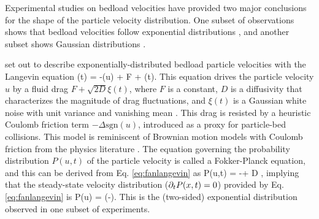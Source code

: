 Experimental studies on bedload velocities have provided two major conclusions for the shape of the particle velocity distribution. One subset of observations shows that bedload velocities follow exponential distributions \citep{Lajeunesse2010,Furbish2012,Fathel2015}, and another subset shows Gaussian distributions \citep{Martin2012,Ancey2014,Heyman2016}.

\citet{Fan2014} set out to describe exponentially-distributed bedload particle velocities with the Langevin equation
\be {}(t) = -\Delta {}(u) + F + \xi(t). \label{eq:fanlangevin}\ee
This equation drives the particle velocity $u$ by a fluid drag $F + \sqrt{2D} \xi(t)$, where $F$ is a constant, $D$ is a diffusivity that characterizes the magnitude of drag fluctuations, and $\xi(t)$ is a Gaussian white noise with unit variance and vanishing mean \citep{Gardiner1983}.
This drag is resisted by a heuristic Coulomb friction term $-\Delta \text{sgn}(u)$, introduced as a proxy for particle-bed collisions. This model is reminiscent of Brownian motion models with Coulomb friction from the physics literature \citep[e.g.][]{DeGennes2005,Touchette2010,Menzel2011}.
The equation governing the probability distribution $P(u,t)$ of the particle velocity is called a Fokker-Planck equation, and this can be derived from Eq. \ref{eq:fanlangevin} as \citep{Risken1989,VanKampen2007} 
\be {} P(u,t) = -\Delta{} + D ,\ee
implying that the steady-state velocity distribution ($\partial_t P(x,t) = 0$) provided by Eq. \ref{eq:fanlangevin} is
\be P(u) = \exp\Big(-\Big).\ee
This is the (two-sided) exponential distribution observed in one subset of experiments.

